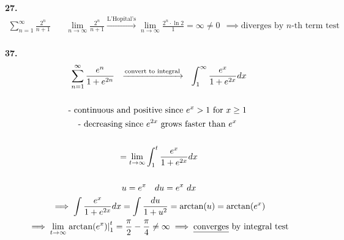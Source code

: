 \documentclass{article}
\begin{document}
\noindent
\textbf{
27.
}
\\
\begin{gather*}
\sum_{n=1}^{\infty} \frac{2^n}{n+1}
~~~~~~~~
\lim_{n \to \infty} \frac{2^n}{n+1}
\xrightarrow{\text{L'Hopital's}}
\lim_{n \to \infty} \frac{2^n \cdot \ln 2}{1}=\infty \neq 0
~~\implies
\text{diverges by $n$-th term test}
\\
\end{gather*}



\noindent
\textbf{
37.
}
\\
\begin{gather*}
\sum_{n=1}^{\infty} \frac{e^n}{1+e^{2n}}
~~\xrightarrow{\text{convert to integral}}~~
\int_1^{\infty} \frac{e^x}{1+e^{2x}}dx
\\
\\
\text{- continuous and positive since $e^x>1$ for $x\geq 1$ }
\\
\text{- decreasing since $e^{2x}$ grows faster than $e^x$ }
\\
\\
=\lim_{t \to \infty}
\int_1^t \frac{e^x}{1+e^{2x}}dx
\\
\\
u=e^x ~~~ du=e^x~dx
\\
\implies
\int \frac{e^x}{1+e^{2x}}dx=\int \frac{du}{1+u^2}=\arctan(u)=\arctan(e^x)
\\
\implies
\lim_{t \to \infty}
\left. \arctan(e^x) \right|_1^t=\frac{\pi}{2}-\frac{\pi}{4}\neq \infty \implies
\text{\underline{converges} by integral test}
\end{gather*}
\end{document}
